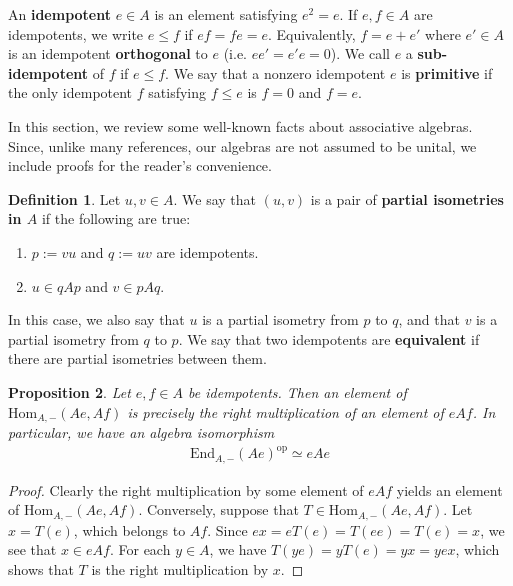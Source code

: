 \documentclass[11pt,b5paper,notitlepage]{article}
\theoremstyle{definition}
\newtheorem{df}{Definition}[section]
\theoremstyle{plain}
\newtheorem{pp}[df]{Proposition}
\newcommand{\End}{\mathrm{End}} %
\newcommand{\Hom}{\mathrm{Hom}}
\newcommand{\opp}{\mathrm{op}}
\numberwithin{equation}{section}
\begin{document}
An \textbf{idempotent} $e\in A$ is an element satisfying $e^2=e$. If $e,f\in A$ are idempotents, we write $e\leq f$ if $ef=fe=e$. Equivalently, $f=e+e'$ where $e'\in A$ is an idempotent \textbf{orthogonal} to $e$ (i.e. $ee'=e'e=0$). We call $e$ a \textbf{sub-idempotent} of $f$ if $e\leq f$. We say that a nonzero idempotent $e$ is \textbf{primitive} if the only idempotent $f$ satisfying $f\leq e$ is $f=0$ and $f=e$.


In this section, we review some well-known facts about associative algebras. Since, unlike many references, our algebras are not assumed to be unital, we include proofs for the reader's convenience.

\begin{df}
Let $u,v\in A$. We say that $(u,v)$ is a pair of \textbf{partial isometries in $A$} if the following are true:
\begin{enumerate}[label=(\alph*)]
\item $p:=vu$ and $q:=uv$ are idempotents.
\item $u\in qAp$ and $v\in pAq$.
\end{enumerate}
In this case, we also say that $u$ is a partial isometry from $p$ to $q$, and that $v$ is a partial isometry from $q$ to $p$. We say that two idempotents are \textbf{equivalent} if there are partial isometries between them.
\end{df}


\begin{pp}\label{lb6}
Let $e,f\in A$ be idempotents. Then an element of $\Hom_{A,-}(Ae,Af)$ is precisely the right multiplication of an element of $eAf$. In particular, we have an algebra isomorphism
\begin{align*}
\End_{A,-}(Ae)^\opp\simeq eAe
\end{align*}
\end{pp}


\begin{proof}
Clearly the right multiplication by some element of $eAf$ yields an element of $\Hom_{A,-}(Ae,Af)$. Conversely, suppose that $T\in \Hom_{A,-}(Ae,Af)$. Let $x=T(e)$, which belongs to $Af$. Since $ex=eT(e)=T(ee)=T(e)=x$, we see that $x\in eAf$. For each $y\in A$, we have $T(ye)=yT(e)=yx=yex$, which shows that $T$ is the right multiplication by $x$.
\end{proof}
\end{document}
